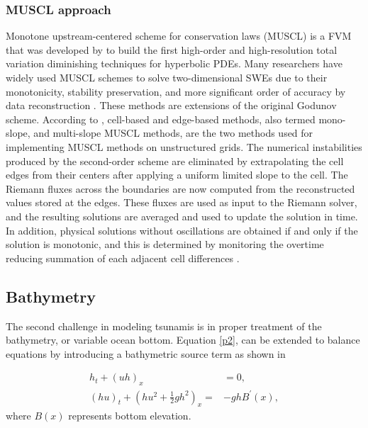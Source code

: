 \documentclass[10pt,a4paper]{article}
\begin{document}
	\subsubsection{MUSCL approach}
	
	Monotone upstream-centered scheme for conservation laws (MUSCL) is a FVM that was developed by \citet{van1979towards} to build the first high-order and high-resolution total variation diminishing techniques for hyperbolic PDEs. Many researchers have widely used MUSCL schemes to solve two-dimensional SWEs due to their monotonicity, stability preservation, and more significant order of accuracy by data reconstruction \citep{song2011robust,zhao2019improved,marche2007evaluation,liang2009adaptive}.  These methods are extensions of the original Godunov scheme.     According to  \citet{hou20132d}, cell-based and edge-based methods, also termed mono-slope, and multi-slope MUSCL methods, are the two methods used for implementing MUSCL methods on unstructured grids. The numerical instabilities produced by the second-order scheme are eliminated by extrapolating the cell edges from their centers after applying a uniform limited slope to the cell. The Riemann fluxes across the boundaries are now computed from the reconstructed values stored at the edges.  These fluxes are used as input to the Riemann solver, and the resulting solutions are averaged and used to update the solution in time.  In addition, physical solutions without oscillations are obtained if and only if the solution is monotonic, and this is determined by monitoring the overtime reducing summation of each adjacent cell differences \citep{hou2014multislope}.
	
	
	
	
	
	
	\subsection{Bathymetry}
	The second challenge in modeling tsunamis is in proper treatment of the bathymetry, or variable ocean bottom. 
	Equation \eqref{p2}, can be extended to balance equations by introducing a bathymetric source term as shown in 
	
	\begin{equation}
		\begin{aligned}
			h_{t} + (uh)_x &= 0, \\
			(hu)_t + \left(hu^{2} + \frac{1}{2}gh^{2} \right)_x =& -ghB^{\prime}(x),
			\label{bst}
		\end{aligned}
	\end{equation}	
	where $B(x)$ represents bottom elevation. 
	
\end{document}
